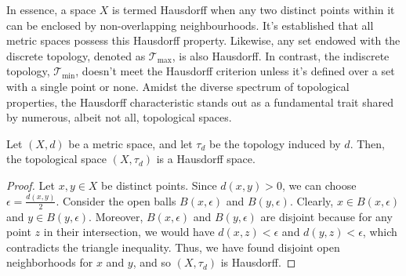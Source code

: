 In essence, a space \( X \) is termed Hausdorff when any two distinct points within it can be enclosed by non-overlapping neighbourhoods. It's established that all metric spaces possess this Hausdorff property. Likewise, any set endowed with the discrete topology, denoted as \( \mathcal{T}_{\text{max}} \), is also Hausdorff. In contrast, the indiscrete topology, \( \mathcal{T}_{\text{min}} \), doesn't meet the Hausdorff criterion unless it's defined over a set with a single point or none. Amidst the diverse spectrum of topological properties, the Hausdorff characteristic stands out as a fundamental trait shared by numerous, albeit not all, topological spaces.

\begin{lemma}
    Let \( (X, d) \) be a metric space, and let \( \tau_d \) be the topology induced by \( d \). Then, the topological space \( (X, \tau_d) \) is a Hausdorff space.
\end{lemma}
\begin{proof}
        Let \( x, y \in X \) be distinct points. Since \( d(x,y) > 0 \), we can choose \( \epsilon = \frac{d(x,y)}{2} \). Consider the open balls \( B(x, \epsilon) \) and \( B(y, \epsilon) \). Clearly, \( x \in B(x, \epsilon) \) and \( y \in B(y, \epsilon) \). Moreover, \( B(x, \epsilon) \) and \( B(y, \epsilon) \) are disjoint because for any point \( z \) in their intersection, we would have \( d(x,z) < \epsilon \) and \( d(y,z) < \epsilon \), which contradicts the triangle inequality. Thus, we have found disjoint open neighborhoods for \( x \) and \( y \), and so \( (X, \tau_d) \) is Hausdorff.
    \end{proof}

